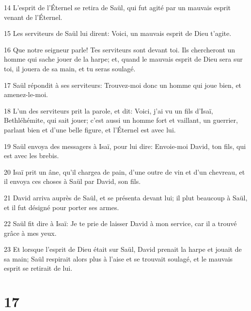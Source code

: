 \par 14 L'esprit de l'Éternel se retira de Saül, qui fut agité par un mauvais esprit venant de l'Éternel.
\par 15 Les serviteurs de Saül lui dirent: Voici, un mauvais esprit de Dieu t'agite.
\par 16 Que notre seigneur parle! Tes serviteurs sont devant toi. Ils chercheront un homme qui sache jouer de la harpe; et, quand le mauvais esprit de Dieu sera sur toi, il jouera de sa main, et tu seras soulagé.
\par 17 Saül répondit à ses serviteurs: Trouvez-moi donc un homme qui joue bien, et amenez-le-moi.
\par 18 L'un des serviteurs prit la parole, et dit: Voici, j'ai vu un fils d'Isaï, Bethléhémite, qui sait jouer; c'est aussi un homme fort et vaillant, un guerrier, parlant bien et d'une belle figure, et l'Éternel est avec lui.
\par 19 Saül envoya des messagers à Isaï, pour lui dire: Envoie-moi David, ton fils, qui est avec les brebis.
\par 20 Isaï prit un âne, qu'il chargea de pain, d'une outre de vin et d'un chevreau, et il envoya ces choses à Saül par David, son fils.
\par 21 David arriva auprès de Saül, et se présenta devant lui; il plut beaucoup à Saül, et il fut désigné pour porter ses armes.
\par 22 Saül fit dire à Isaï: Je te prie de laisser David à mon service, car il a trouvé grâce à mes yeux.
\par 23 Et lorsque l'esprit de Dieu était sur Saül, David prenait la harpe et jouait de sa main; Saül respirait alors plus à l'aise et se trouvait soulagé, et le mauvais esprit se retirait de lui.

\chapter{17}

